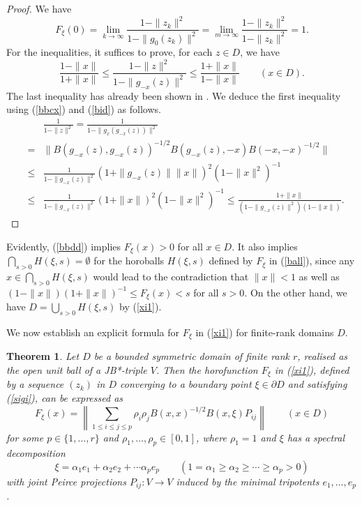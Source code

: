 \documentclass[12pt, twoside]{article}
\newtheorem{theorem}{Theorem}[section]
\theoremstyle{definition}
\numberwithin{equation}{section}
\begin{document}
\begin{proof}
We have
$$ F_\xi (0) =\lim_{k\rightarrow \infty} \frac{1-\|z_k\|^2}{1-\|g_{0}(z_k)\|^2}
 =\lim_{m\rightarrow \infty} \frac{1-\|z_k\|^2}{1-\|z_k\|^2}=1.$$
For the inequalities,
it suffices to prove, for each  $z\in D$,  we have
$$\frac{1-\|x\|}{1+\|x\|} \leq \frac{1-\|z\|^2}{1-\|g_{-x}(z)\|^2} \leq  \frac{1+\|x\|}{1-\|x\|} \qquad (x\in D).$$
The last inequality has already been shown in \cite[Lemma 4.1]{horo}.
We deduce the first inequality using (\ref{bbcx}) and (\ref{bid}) as follows.
\begin{eqnarray*}
&& \frac{1}{1-\|z\|^2} = \frac{1}{1-\|g_x(g_{-x}(z))\|^2 }\\
&=&\|B(g_{-x}(z),g_{-x}(z))^{-1/2}B(g_{-x}(z),-x)B(-x,-x)^{-1/2}\|\\
&\leq & \frac{1}{1-\|g_{-x}(z)\|^2}(1+\|g_{-x}(z)\|\|x\|)^2 (1-\|x\|^2)^{-1}\\
&\leq & \frac{1}{1-\|g_{-x}(z)\|^2}(1+\|x\|)^2 (1-\|x\|^2)^{-1}
\leq \frac{1+\|x\|}{(1-\|g_{-x}(z)\|^2) (1-\|x\|)}.
\end{eqnarray*}
\end{proof}
Evidently, (\ref{bbdd}) implies $F_\xi(x)>0$ for all $x\in D$. It also implies
$\bigcap_{s>0} H(\xi,s) = \emptyset$ for the horoballs $H(\xi,s)$ defined by $F_\xi$  in (\ref{ball}),
since any $x\in \bigcap_{s>0} H(\xi,s)$ would lead to the contradiction that $\|x\|<1$ as well as
$(1-\|x\|)(1+\|x\|)^{-1} \leq F_\xi(x) <s$ for all $s>0$. On the other hand, we have $D = \bigcup_{s>0} H(\xi,s)$
by (\ref{xi1}).

We now establish an explicit formula for $F_\xi$ in (\ref{xi1}) for finite-rank domains $D$.

\begin{theorem}\label{horo} Let $D$ be a bounded symmetric domain of finite rank $r$, realised as the open unit
ball of a JB*-triple $V$. Then the horofunction $F_\xi$  in (\ref{xi1}), defined by   a sequence $(z_k)$ in $D$ converging to a boundary point $\xi \in \partial D$ and satisfying (\ref{sigi}), can be expressed as
\begin{equation}\label{fxi}
F_\xi(x) =\left\|\sum_{1\leq i\leq j\leq p}\rho_i\rho_jB(x,x)^{-1/2}B(x,\xi)P_{ij}\right\|
\qquad (x\in D)
\end{equation}
for some $p\in \{1, \ldots, r\}$ and $\rho_1, \ldots, \rho_p \in [0,1]$,
where  $\rho_1=1$
and  $\xi$ has a spectral decomposition
$$\xi = \alpha_1 e_1 + \alpha_2 e_2 + \cdots \alpha_p e_p \qquad (1=\alpha_1 \geq \alpha_2 \geq \cdots \geq \alpha_p>0)
$$
with joint Peirce projections $P_{ij}: V \longrightarrow V$  induced
by the minimal tripotents $e_1, \ldots, e_{p}$.
\end{theorem}
\end{document}
